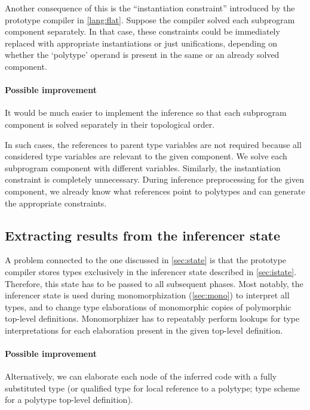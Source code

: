 Another consequence of this is the ``instantiation constraint'' introduced by the prototype compiler in \cref{lang:flat}. Suppose the compiler solved each subprogram component separately. In that case, these constraints could be immediately replaced with appropriate instantiations or just unifications, depending on whether the `polytype' operand is present in the same or an already solved component.

\paragraph{Possible improvement}
It would be much easier to implement the inference so that each subprogram component is solved separately in their topological order.

In such cases, the references to parent type variables are not required because all considered type variables are relevant to the given component. We solve each subprogram component with different variables. Similarly, the instantiation constraint is completely unnecessary. During inference preprocessing for the given component, we already know what references point to polytypes and can generate the appropriate constraints.

\subsection{Extracting results from the inferencer state}
\label{sec:inferInter}

A problem connected to the one discussed in \cref{sec:state} is that the prototype compiler stores types exclusively in the inferencer state described in \cref{sec:istate}. Therefore, this state has to be passed to all subsequent phases. Most notably, the inferencer state is used during monomorphization (\cref{sec:mono}) to interpret all types, and to change type elaborations of monomorphic copies of polymorphic top-level definitions. Monomorphizer has to repeatably perform lookups for type interpretations for each elaboration present in the given top-level definition.

\paragraph{Possible improvement}
Alternatively, we can elaborate each node of the inferred code with a fully substituted type (or qualified type for local reference to a polytype; type scheme for a polytype top-level definition).

